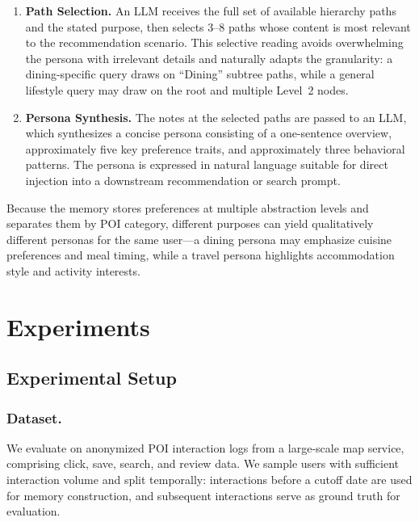\documentclass[manuscript,screen,review]{acmart}
\begin{document}
\begin{enumerate}
    \item \textbf{Path Selection.} An LLM receives the full set of available hierarchy paths and the stated purpose, then selects 3--8 paths whose content is most relevant to the recommendation scenario. This selective reading avoids overwhelming the persona with irrelevant details and naturally adapts the granularity: a dining-specific query draws on ``Dining'' subtree paths, while a general lifestyle query may draw on the root and multiple Level~2 nodes.

    \item \textbf{Persona Synthesis.} The notes at the selected paths are passed to an LLM, which synthesizes a concise persona consisting of a one-sentence overview, approximately five key preference traits, and approximately three behavioral patterns. The persona is expressed in natural language suitable for direct injection into a downstream recommendation or search prompt.
\end{enumerate}

Because the memory stores preferences at multiple abstraction levels and separates them by POI category, different purposes can yield qualitatively different personas for the same user---a dining persona may emphasize cuisine preferences and meal timing, while a travel persona highlights accommodation style and activity interests.


\section{Experiments}

\subsection{Experimental Setup}

\subsubsection{Dataset.}
We evaluate on anonymized POI interaction logs from a large-scale map service, comprising click, save, search, and review data. We sample users with sufficient interaction volume and split temporally: interactions before a cutoff date are used for memory construction, and subsequent interactions serve as ground truth for evaluation.
\end{document}
